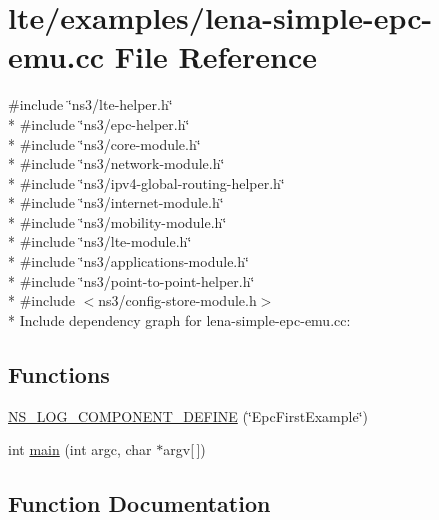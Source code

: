 \hypertarget{lena-simple-epc-emu_8cc}{}\section{lte/examples/lena-\/simple-\/epc-\/emu.cc File Reference}
\label{lena-simple-epc-emu_8cc}
{\ttfamily \#include \char`\"{}ns3/lte-\/helper.\+h\char`\"{}}\\*
{\ttfamily \#include \char`\"{}ns3/epc-\/helper.\+h\char`\"{}}\\*
{\ttfamily \#include \char`\"{}ns3/core-\/module.\+h\char`\"{}}\\*
{\ttfamily \#include \char`\"{}ns3/network-\/module.\+h\char`\"{}}\\*
{\ttfamily \#include \char`\"{}ns3/ipv4-\/global-\/routing-\/helper.\+h\char`\"{}}\\*
{\ttfamily \#include \char`\"{}ns3/internet-\/module.\+h\char`\"{}}\\*
{\ttfamily \#include \char`\"{}ns3/mobility-\/module.\+h\char`\"{}}\\*
{\ttfamily \#include \char`\"{}ns3/lte-\/module.\+h\char`\"{}}\\*
{\ttfamily \#include \char`\"{}ns3/applications-\/module.\+h\char`\"{}}\\*
{\ttfamily \#include \char`\"{}ns3/point-\/to-\/point-\/helper.\+h\char`\"{}}\\*
{\ttfamily \#include $<$ns3/config-\/store-\/module.\+h$>$}\\*
Include dependency graph for lena-\/simple-\/epc-\/emu.cc\+:
\subsection*{Functions}
\begin{DoxyCompactItemize}
\item 
\hyperlink{lena-simple-epc-emu_8cc_ab5b2d5577332f9a2c1d6b2d32293401e}{N\+S\+\_\+\+L\+O\+G\+\_\+\+C\+O\+M\+P\+O\+N\+E\+N\+T\+\_\+\+D\+E\+F\+I\+NE} (\char`\"{}Epc\+First\+Example\char`\"{})
\item 
int \hyperlink{lena-simple-epc-emu_8cc_a0ddf1224851353fc92bfbff6f499fa97}{main} (int argc, char $\ast$argv\mbox{[}$\,$\mbox{]})
\end{DoxyCompactItemize}


\subsection{Function Documentation}
